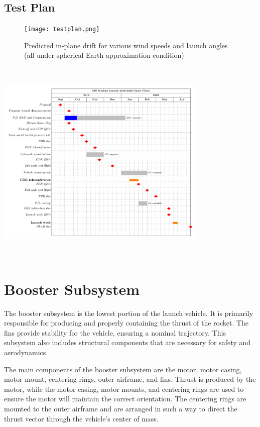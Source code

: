     \subsection{Test Plan}
    \FloatBarrier
    \begin{figure}[h]
    \centering
    \texttt{[image: testplan.png]}
    \caption{Predicted in-plane drift for various wind speeds and launch angles (all under spherical Earth approximation condition)}
    \label{fig:my_label}
\end{figure}
    \includegraphics[width = 10cm, height = 10cm]{img/GanttChart.pdf}

\section{Booster Subsystem}
The booster subsystem is the lowest portion of the launch vehicle. It is primarily responsible for producing and properly containing the thrust of the rocket. The fins provide stability for the vehicle, ensuring a nominal trajectory. This subsystem also includes structural components that are necessary for safety and aerodynamics.

The main components of the booster subsystem are the motor, motor casing, motor mount, centering rings, outer airframe, and fins. Thrust is produced by the motor, while the motor casing, motor mounts, and centering rings are used to ensure the motor will maintain the correct orientation. The centering rings are mounted to the outer airframe and are arranged in such a way to direct the thrust vector through the vehicle’s center of mass.

